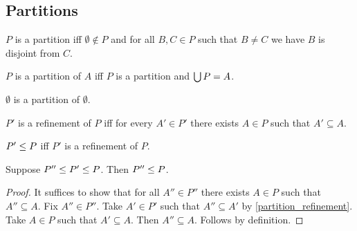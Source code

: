 

\subsection{Partitions}

\begin{definition}\label{partition}
    $P$ is a partition iff
    $\emptyset\notin P$ and
    for all $B, C\in P$ such that $B\neq C$ we have $B$ is disjoint from $C$.
\end{definition}

\begin{abbreviation}\label{partition_of}
    $P$ is a partition of $A$ iff
    $P$ is a partition and
    $\bigcup P = A$.
\end{abbreviation}

\begin{proposition}\label{partition_emptyset}
    $\emptyset$ is a partition of $\emptyset$.
\end{proposition}

\begin{definition}\label{partition_refinement}
    $P'$ is a refinement of $P$ iff
    for every $A'\in P'$ there exists
    $A\in P$ such that $A'\subseteq A$.
\end{definition}

\begin{abbreviation}\label{partition_refines}
    $P'\leq P$ iff
    $P'$ is a refinement of $P$.
\end{abbreviation}

\begin{proposition}\label{partition_refinement_transitive}
    Suppose $P''\leq P'\leq P$.
    Then $P''\leq P$.
\end{proposition}
\begin{proof}
    It suffices to show that for all $A''\in P''$ there exists $A\in P$ such that $A''\subseteq A$.
    Fix $A''\in P''$.
    Take $A'\in P'$ such that $A''\subseteq A'$
        by \cref{partition_refinement}.
    Take $A\in P$ such that $A'\subseteq A$.
    Then $A''\subseteq A$.
    Follows by definition. %
\end{proof}


